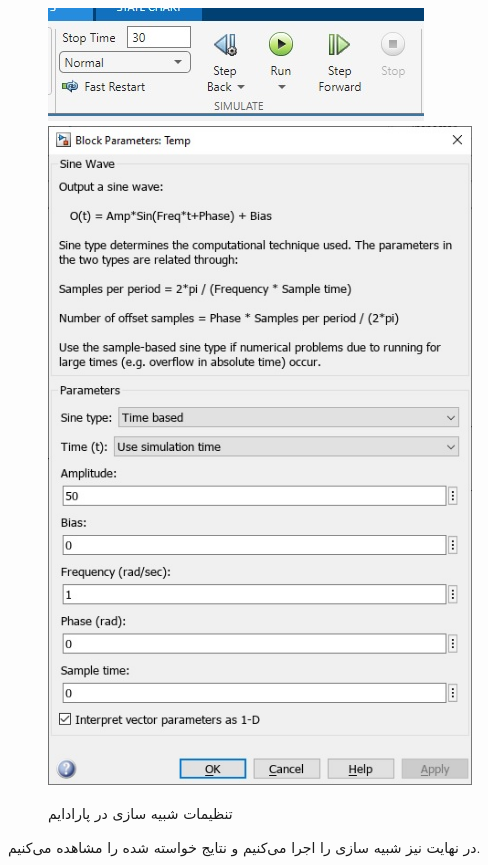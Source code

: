 \documentclass[]{article}
\begin{document}
\begin{figure}[H]
    \centering
    \includegraphics[scale=0.6]{pics/charts_simulate.jpg}
    \includegraphics[scale=0.6]{pics/sine.jpg}
    \caption{ تنظیمات شبیه سازی در پارادایم }
    \label{fig:charts:settings}
\end{figure}
در نهایت نیز شبیه سازی را اجرا می‌کنیم و نتایج خواسته شده را مشاهده می‌کنیم.
\end{document}
